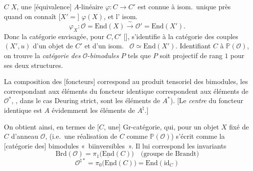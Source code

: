 \documentclass[11pt,a4paper]{article}
\begin{document}
 $C$  $X$, une \struck{\ill{}} [équivalence] $A$-linéaire
$\varphi \colon C \to C'$ \struck{\ill{}} est connue à isom.\ unique près quand on connaît [$X' =$]
$\varphi(X)$, et l'\struck{\ill{}} isom.
\[
  \varphi_{X} \colon \mathcal{O} = \mathrm{End}(X) \xrightarrow{\;\sim\;} \mathcal{O}' = \mathrm{End}(X').
\]
Donc la catégorie envisagée, pour $C, C'$ [\ill{}], s'identifie à la catégorie des couples $(X', u)$
d'un objet de $C'$ et d'un isom.\  $\mathcal{O} \simeq \mathrm{End}(X')$.
Identifiant $C$ à $\mathbb{P}(\mathcal{O})$, on trouve la \emph{catégorie des}
$\mathcal{O}$-\emph{bimodules} $P$ tels que $P$ soit projectif de rang $1$ pour ses deux structures.

La composition des  [foncteurs] correspond au \struck{\ill{}} produit tensoriel des
bimodules, les \struck{\ill{}}  \ill{} correspondant aux éléments du foncteur
identique correspondent aux éléments de $\mathcal{O}^{*}$, , dans le cas Deuring strict,
sont les éléments de  $A^{*}$). [Le \emph{centre} du foncteur identique est $A$
évidemment les éléments de $A^{\natural}$.]

On obtient ainsi, en termes de  [$C$, une] Gr-catégorie, qui, pour un objet $X$
fixé de $C$ d'anneau $\mathcal{O}$, (i.e.\ une réalisation de $C$ comme $\mathbb{P}(\mathcal{O})$)
s'écrit comme la  [catégorie des] bimodules «~biinversibles~». Il lui
correspond les invariants
\[
  \mathrm{Brd}(\mathcal{O}) = \pi_{1}\bigl(\underline{\mathrm{End}}(C)\bigr)
  \quad \text{(groupe de Brandt)}
\]
\[
  \mathcal{O}^{\natural *} = \pi_{0}\bigl(\underline{\mathrm{End}}(C)\bigr) = \mathrm{End}(\mathrm{id}_{C})
\]
\end{document}
